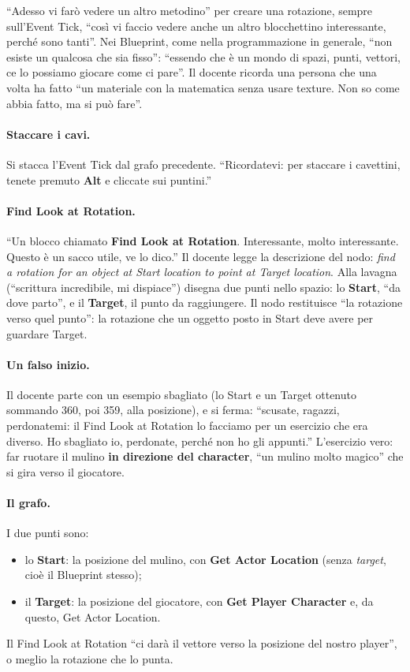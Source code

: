 ``Adesso vi farò vedere un altro metodino'' per creare una rotazione, sempre
sull'Event Tick, ``così vi faccio vedere anche un altro blocchettino interessante,
perché sono tanti''. Nei Blueprint, come nella programmazione in generale, ``non esiste
un qualcosa che sia fisso'': ``essendo che è un mondo di spazi, punti, vettori, ce lo
possiamo giocare come ci pare''. Il docente ricorda una persona che una volta ha fatto
``un materiale con la matematica senza usare texture. Non so come abbia fatto, ma si
può fare''.

\paragraph{Staccare i cavi.} Si stacca l'Event Tick dal grafo precedente. ``Ricordatevi:
per staccare i cavettini, tenete premuto \textbf{Alt} e cliccate sui puntini.''

\paragraph{Find Look at Rotation.} ``Un blocco chiamato \textbf{Find Look at Rotation}.
Interessante, molto interessante. Questo è un sacco utile, ve lo dico.'' Il docente
legge la descrizione del nodo: \emph{find a rotation for an object at Start location to
point at Target location}. Alla lavagna (``scrittura incredibile, mi dispiace'') disegna
due punti nello spazio: lo \textbf{Start}, ``da dove parto'', e il \textbf{Target}, il
punto da raggiungere. Il nodo restituisce ``la rotazione verso quel punto'': la
rotazione che un oggetto posto in Start deve avere per guardare Target.

\paragraph{Un falso inizio.} Il docente parte con un esempio sbagliato (lo Start e un
Target ottenuto sommando 360, poi 359, alla posizione), e si ferma: ``scusate, ragazzi,
perdonatemi: il Find Look at Rotation lo facciamo per un esercizio che era diverso.
Ho sbagliato io, perdonate, perché non ho gli appunti.'' L'esercizio vero: far ruotare
il mulino \textbf{in direzione del character}, ``un mulino molto magico'' che si gira
verso il giocatore.

\paragraph{Il grafo.} I due punti sono:
\begin{itemize}
  \item lo \textbf{Start}: la posizione del mulino, con \textbf{Get Actor Location}
        (senza \emph{target}, cioè il Blueprint stesso);
  \item il \textbf{Target}: la posizione del giocatore, con \textbf{Get Player
        Character} e, da questo, Get Actor Location.
\end{itemize}
Il Find Look at Rotation ``ci darà il vettore verso la posizione del nostro player'',
o meglio la rotazione che lo punta.

